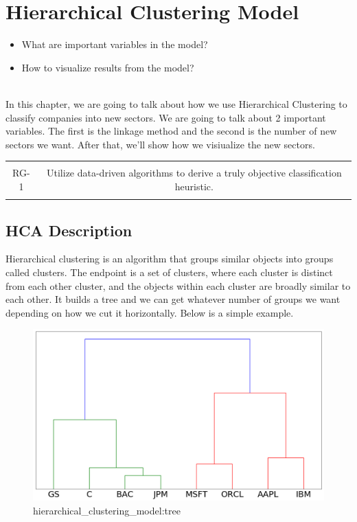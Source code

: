 \documentclass[../main.tex]{subfiles}
\begin{document}
\chapter{Hierarchical Clustering Model}

\begin{itemize}
    \item What are important variables in the model?
    \item How to visualize results from the model?
    \\~\\
\end{itemize}

In this chapter, we are going to talk about how we use Hierarchical Clustering to classify companies into new sectors. We are going to talk about 2 important variables. The first is the linkage method and the second is the number of new sectors we want. After that, we'll show how we visiualize the new sectors.

\begin{table}[h!]
    \centering
    \begin{tabular}{| c | c |}
        \hline
        &  \\
        RG-1 & Utilize data-driven algorithms to derive a truly objective classification heuristic. \\
        & \\
        \hline
    \end{tabular}
\end{table}

\section{HCA Description}

Hierarchical clustering is an algorithm that groups similar objects into groups called clusters. The endpoint is a set of clusters, where each cluster is distinct from each other cluster, and the objects within each cluster are broadly similar to each other. It builds a tree and we can get whatever number of groups we want depending on how we cut it horizontally. Below is a simple example.

\begin{figure}[H]
    \centering
    \includegraphics[scale=0.4]{images/tree.png}
    \caption{hierarchical_clustering_model:tree}
    \label{fig:hierarchical_clustering_model:tree}
\end{figure}
\end{document}
